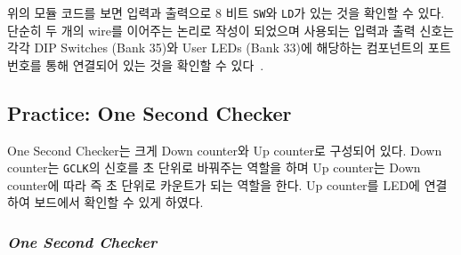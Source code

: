 \documentclass{article}
\begin{document}
위의 모듈 코드를 보면 입력과 출력으로 8 비트 \texttt{SW}와 \texttt{LD}가 있는 것을 확인할 수 있다. 단순히 두 개의 wire를 이어주는 논리로 작성이 되었으며 사용되는 입력과 출력 신호는 각각 DIP Switches (Bank 35)와 User LEDs (Bank 33)에 해당하는 컴포넌트의 포트번호를 통해 연결되어 있는 것을 확인할 수 있다~\cite{UG}.

\newpage
\subsection{Practice: One Second Checker}
One Second Checker는 크게 Down counter와 Up counter로 구성되어 있다. Down counter는 \texttt{GCLK}의 신호를 초 단위로 바꿔주는 역할을 하며 Up counter는 Down counter에 따라 즉 초 단위로 카운트가 되는 역할을 한다. Up counter를 LED에 연결하여 보드에서 확인할 수 있게 하였다.

\subsubsection*{\textit{One Second Checker}}
\end{document}
